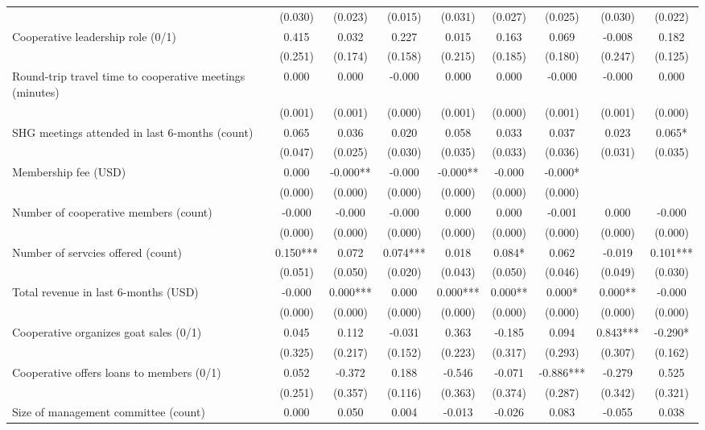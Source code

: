 \documentclass[11pt]{article}
\begin{document}
\begin{landscape}
\begin{table}[H]
{\begin{tabularx}{1.8\linewidth}{lcccccccc}
 & (0.030) & (0.023) & (0.015) & (0.031) & (0.027) & (0.025) & (0.030) & (0.022) \\
Cooperative leadership role (0/1) & 0.415 & 0.032 & 0.227 & 0.015 & 0.163 & 0.069 & -0.008 & 0.182 \\
 & (0.251) & (0.174) & (0.158) & (0.215) & (0.185) & (0.180) & (0.247) & (0.125) \\
Round-trip travel time to cooperative meetings (minutes) & 0.000 & 0.000 & -0.000 & 0.000 & 0.000 & -0.000 & -0.000 & 0.000 \\
 & (0.001) & (0.001) & (0.000) & (0.001) & (0.000) & (0.001) & (0.001) & (0.000) \\
SHG meetings attended in last 6-months (count) & 0.065 & 0.036 & 0.020 & 0.058 & 0.033 & 0.037 & 0.023 & 0.065* \\
 & (0.047) & (0.025) & (0.030) & (0.035) & (0.033) & (0.036) & (0.031) & (0.035) \\
Membership fee (USD) & 0.000 & -0.000** & -0.000 & -0.000** & -0.000 & -0.000* &  &  \\
 & (0.000) & (0.000) & (0.000) & (0.000) & (0.000) & (0.000) &  &  \\
Number of cooperative members (count) & -0.000 & -0.000 & -0.000 & 0.000 & 0.000 & -0.001 & 0.000 & -0.000 \\
 & (0.000) & (0.000) & (0.000) & (0.000) & (0.000) & (0.000) & (0.000) & (0.000) \\
Number of servcies offered (count) & 0.150*** & 0.072 & 0.074*** & 0.018 & 0.084* & 0.062 & -0.019 & 0.101*** \\
 & (0.051) & (0.050) & (0.020) & (0.043) & (0.050) & (0.046) & (0.049) & (0.030) \\
Total revenue in last 6-months (USD) & -0.000 & 0.000*** & 0.000 & 0.000*** & 0.000** & 0.000* & 0.000** & -0.000 \\
 & (0.000) & (0.000) & (0.000) & (0.000) & (0.000) & (0.000) & (0.000) & (0.000) \\
Cooperative organizes goat sales (0/1) & 0.045 & 0.112 & -0.031 & 0.363 & -0.185 & 0.094 & 0.843*** & -0.290* \\
 & (0.325) & (0.217) & (0.152) & (0.223) & (0.317) & (0.293) & (0.307) & (0.162) \\
Cooperative offers loans to members (0/1) & 0.052 & -0.372 & 0.188 & -0.546 & -0.071 & -0.886*** & -0.279 & 0.525 \\
 & (0.251) & (0.357) & (0.116) & (0.363) & (0.374) & (0.287) & (0.342) & (0.321) \\
Size of management committee (count) & 0.000 & 0.050 & 0.004 & -0.013 & -0.026 & 0.083 & -0.055 & 0.038 \\

\end{tabularx}}
\end{table}
\end{landscape}
\end{document}
